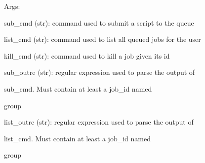 \documentclass[letterpaper,10pt,english]{sphinxmanual}
\begin{document}
\begin{fulllineitems}
\begin{DUlineblock}{0em}
\item[] Args:
\item[]
\begin{DUlineblock}{\DUlineblockindent}
\item[] sub\_cmd (str): command used to submit a script to the queue
\item[] list\_cmd (str): command used to list all queued jobs for the user
\item[] kill\_cmd (str): command used to kill a job given its id
\item[] sub\_outre (str): regular expression used to parse the output of
\item[]
\begin{DUlineblock}{\DUlineblockindent}
\item[] sub\_cmd. Must contain at least a job\_id named
\item[] group
\end{DUlineblock}
\item[] list\_outre (str): regular expression used to parse the output of
\item[]
\begin{DUlineblock}{\DUlineblockindent}
\item[] list\_cmd. Must contain at least a job\_id named
\item[] group
\end{DUlineblock}
\end{DUlineblock}
\end{DUlineblock}

\begin{fulllineitems}
\label{doctree/soprano.hpc.submitter.queues:soprano.hpc.submitter.queues.QueueInterface.GridEngine}
\end{fulllineitems}


\begin{fulllineitems}
\label{doctree/soprano.hpc.submitter.queues:soprano.hpc.submitter.queues.QueueInterface.LSF}
\end{fulllineitems}



\end{fulllineitems}
\end{document}

